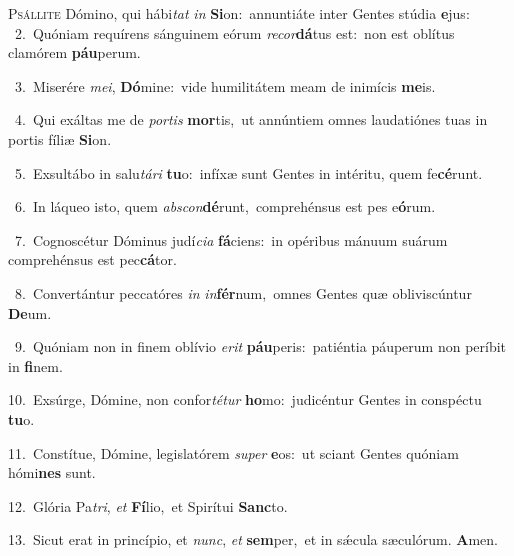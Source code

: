 \lettrine{\initial\textcolor{\initialcolor}{P}}{sállite} Dómino, qui hábi\textit{tat} \textit{in} \textbf{Si}\-on:~\star annuntiáte inter Gentes stúdia \textbf{e}\-jus:\\
{\numbfont\textcolor{\numbcolor}{~2.}}~Quóniam requírens sánguinem eórum \textit{re}\-\textit{cor}\textbf{dá}tus est:~\star non est oblítus clamórem \textbf{páu}\-perum.\par
{\numbfont\textcolor{\numbcolor}{~3.}}~Miserére \textit{me}\-\textit{i}, \textbf{Dó}\-mine:~\star vide humilitátem meam de inimícis \textbf{me}\-is.\par
{\numbfont\textcolor{\numbcolor}{~4.}}~Qui exáltas me de \textit{por}\-\textit{tis} \textbf{mor}\-tis,~\star ut annúntiem omnes laudatiónes tuas in portis fíliæ \textbf{Si}\-on.\par
{\numbfont\textcolor{\numbcolor}{~5.}}~Exsultábo in salu\-\textit{tá}\-\textit{ri} \textbf{tu}\-o:~\star infíxæ sunt Gentes in intéritu, quem fe\-\textbf{cé}\-runt.\par
{\numbfont\textcolor{\numbcolor}{~6.}}~In láqueo isto, quem \textit{abs}\-\textit{con}\textbf{dé}runt,~\star comprehénsus est pes e\-\textbf{ó}\-rum.\par
{\numbfont\textcolor{\numbcolor}{~7.}}~Cognoscétur Dóminus judí\-\textit{ci}\-\textit{a} \textbf{fá}\-ciens:~\star in opéribus mánuum suárum comprehénsus est pec\-\textbf{cá}\-tor.\par
{\numbfont\textcolor{\numbcolor}{~8.}}~Convertántur peccatóres \textit{in} \textit{in}\-\textbf{fér}num,~\star omnes Gentes quæ obliviscúntur \textbf{De}\-um.\par
{\numbfont\textcolor{\numbcolor}{~9.}}~Quóniam non in finem oblívio \textit{e}\-\textit{rit} \textbf{páu}\-peris:~\star patiéntia páuperum non períbit in \textbf{fi}\-nem.\par
{\numbfont\textcolor{\numbcolor}{10.}}~Exsúrge, Dómine, non confor\-\textit{té}\-\textit{tur} \textbf{ho}\-mo:~\star judicéntur Gentes in conspéctu \textbf{tu}\-o.\par
{\numbfont\textcolor{\numbcolor}{11.}}~Constítue, Dómine, legislatórem \textit{su}\-\textit{per} \textbf{e}\-os:~\star ut sciant Gentes quóniam hómi\textbf{nes} sunt.\par
{\numbfont\textcolor{\numbcolor}{12.}}~Glória Pa\-\textit{tri}\-, \textit{et} \textbf{Fí}\-lio,~\star et Spirítui \textbf{Sanc}\-to.\par
{\numbfont\textcolor{\numbcolor}{13.}}~Sicut erat in princípio, et \textit{nunc}\-, \textit{et} \textbf{sem}\-per,~\star et in sǽcula sæculórum. \textbf{A}\-men.\par
